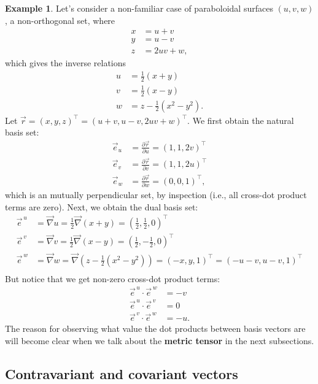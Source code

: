 \documentclass{article}
\theoremstyle{definition}
\newtheorem{exmp}{Example}[section]
\begin{document}
\begin{exmp}
Let's consider a non-familiar case of paraboloidal surfaces $(u,v,w)$, a non-orthogonal set, where
\begin{align*}
x &= u+v\\y&=u-v\\z&=2uv+w,
\end{align*}
which gives the inverse relations
\begin{align*}
u&=\frac{1}{2}(x+y)\\
v&=\frac{1}{2}(x-y)\\
w&=z-\frac{1}{2}(x^2-y^2).
\end{align*}
Let $\vec{r} = (x,y,z)^\top = (u+v, u-v, 2uv + w)^\top$. We first obtain the natural basis set:
\begin{align*}
\vec{e}_u &= \frac{\partial \vec{r}}{\partial u} = (1,1,2v)^\top \\
\vec{e}_v &= \frac{\partial \vec{r}}{\partial v} = (1,1,2u)^\top \\
\vec{e}_w &= \frac{\partial \vec{r}}{\partial w} = (0,0,1)^\top, 
\end{align*}
which is an mutually perpendicular set, by inspection (i.e., all cross-dot product terms are zero). Next, we obtain the dual basis set:
\begin{align*}
\vec{e}^{\,u} &= \vec{\nabla}u = \frac{1}{2}\vec{\nabla}(x+y) = \left( \frac{1}{2}, \frac{1}{2},0\right) ^\top\\
\vec{e}^{\,v} &= \vec{\nabla}v = \frac{1}{2}\vec{\nabla}(x-y) = \left( \frac{1}{2}, -\frac{1}{2},0\right) ^\top\\
\vec{e}^{\,w} &= \vec{\nabla}w = \vec{\nabla}\left( z-\frac{1}{2}(x^2-y^2)\right)  = (-x,y,1)^\top = (-u-v,u-v,1)^\top\\
\end{align*}
But notice that we get non-zero cross-dot product terms:
\begin{align*}
\vec{e}^{\,u}\cdot\vec{e}^{\,w} &= -v \\
\vec{e}^{\,u}\cdot\vec{e}^{\,v} &= 0 \\
\vec{e}^{\,v}\cdot\vec{e}^{\,w} &= -u. 
\end{align*}
The reason for observing what value the dot products between basis vectors are will become clear when we talk about the \textbf{metric tensor} in the next subsections.
\end{exmp}
\subsection{Contravariant and covariant vectors}
\end{document}
